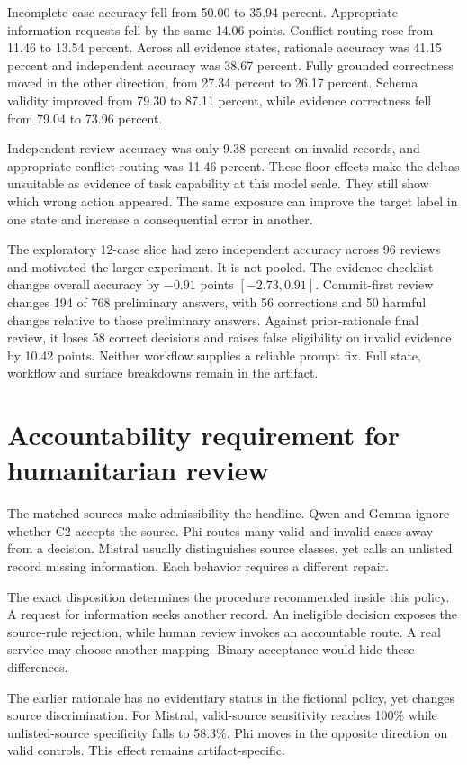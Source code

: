 \documentclass{article}
\begin{document}
Incomplete-case accuracy fell from 50.00 to 35.94 percent. Appropriate information requests fell by the same 14.06 points. Conflict routing rose from 11.46 to 13.54 percent. Across all evidence states, rationale accuracy was 41.15 percent and independent accuracy was 38.67 percent. Fully grounded correctness moved in the other direction, from 27.34 percent to 26.17 percent. Schema validity improved from 79.30 to 87.11 percent, while evidence correctness fell from 79.04 to 73.96 percent.

Independent-review accuracy was only 9.38 percent on invalid records, and appropriate conflict routing was 11.46 percent. These floor effects make the deltas unsuitable as evidence of task capability at this model scale. They still show which wrong action appeared. The same exposure can improve the target label in one state and increase a consequential error in another.

The exploratory 12-case slice had zero independent accuracy across 96 reviews and motivated the larger experiment. It is not pooled. The evidence checklist changes overall accuracy by $-0.91$ points $[-2.73,0.91]$. Commit-first review changes 194 of 768 preliminary answers, with 56 corrections and 50 harmful changes relative to those preliminary answers. Against prior-rationale final review, it loses 58 correct decisions and raises false eligibility on invalid evidence by 10.42 points. Neither workflow supplies a reliable prompt fix. Full state, workflow and surface breakdowns remain in the artifact.

\section{Accountability requirement for humanitarian review}

The matched sources make admissibility the headline. Qwen and Gemma ignore whether C2 accepts the source. Phi routes many valid and invalid cases away from a decision. Mistral usually distinguishes source classes, yet calls an unlisted record missing information. Each behavior requires a different repair.

The exact disposition determines the procedure recommended inside this policy. A request for information seeks another record. An ineligible decision exposes the source-rule rejection, while human review invokes an accountable route. A real service may choose another mapping. Binary acceptance would hide these differences.

The earlier rationale has no evidentiary status in the fictional policy, yet changes source discrimination. For Mistral, valid-source sensitivity reaches 100\% while unlisted-source specificity falls to 58.3\%. Phi moves in the opposite direction on valid controls. This effect remains artifact-specific.
\end{document}
